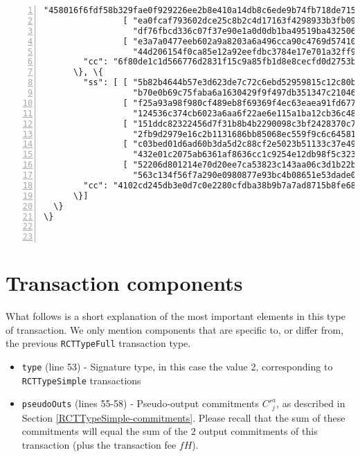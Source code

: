 \begin{appendices}
\begin{Verbatim}[commandchars=\\\{\}, numbers=left]
                  "458016f6fdf58b329fae0f929226ee2b8e410a14db8c6ede9b74fb718de71507"], 
                [ "ea0fcaf793602dce25c8b2c4d17163f4298933b3fb09874307d8cde9a63c2c0c", 
                  "df76fbcd336c07f37e90e1a0d0db1ba49519ba4325062228bc9242af2c525703"], 
                [ "e3a7a0477eeb602a9a8203a6a496cca90c4769d57410246c4c8d665df34df900", 
                  "44d206154f0ca85e12a92eefdbc3784e17e701a32ff93b550467679f67500c0d"]], 
        "cc": "6f80de1c1d566776d2831f15c9a85fb1d8e8cecfd0d2753b318f0e84d89d3b08"
      \}, \{
        "ss": [ [ "5b82b4644b57e3d623de7c72c6ebd52959815c12c80b479e4cbe5437cf67640c", 
                  "b70e0b69c75faba6a1630429f9f497db351347c210467f69e1b1c5f1a72afe02"], 
                [ "f25a93a98f980cf489eb8f69369f4ec63eaea91fd677decab9b6ca0fe2feb606", 
                  "124536c374cb6023a6aa6f22ae6e115a1ba12cb36c48f5f5ad43ce90f471da02"], 
                [ "151ddc82322456d7f31b8b4b2290098c3bf2428370c7ef325660b5463ff26404", 
                  "2fb9d2979e16c2b1131686bb85068ec559f9c6c64581e609b451bb2cd9d5740d"], 
                [ "c03bed01d6ad60b3da5d2c88cf2e5023b51133c37e4917511715a11f09d8740d", 
                  "432e01c2075ab6361af8636cc1c9254e12db98f5c323088792dfb42a1c894401"], 
                [ "52206d801214e70d20ee7ca53823c143aa06c3d1b22b118cc8a15c9f861f0102", 
                  "563c134f56f7a290e0980877e93bc4b08651e53dade079b1e6c066b70fb81406"]], 
        "cc": "4102cd245db3e0d7c0e2280cfdba38b9b7a7ad8715b8fe68c1170cf923b3d70d"
      \}]
  \}
\}



\end{Verbatim}

\section*{Transaction components}

What follows is a short explanation of the most important elements in this type of transaction. We only mention components that are specific to, or differ from, the previous {\tt RCTTypeFull} transaction type.


\begin{itemize}
	\item {\tt type} (line 53) - Signature type, in this case the value 2, corresponding to {\tt RCTTypeSimple} transactions
    \item {\tt pseudoOuts} (lines 55-58) - Pseudo-output commitments $C'^a_j$, as described in Section  \ref{RCTTypeSimple-commitments}. Please recall that the sum of these commitments will equal the sum of the 2 output commitments of this transaction (plus the transaction fee $f H$).
\end{itemize}

\end{appendices}